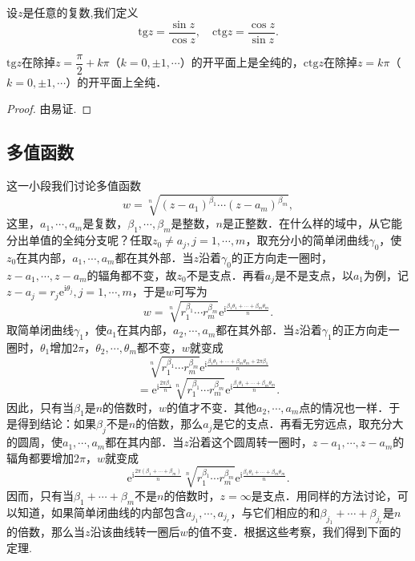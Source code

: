 \documentclass[../../main.tex]{subfiles}
\begin{document}
\begin{definition}
设$z$是任意的复数,我们定义
\[
\text{tg} z = \dfrac{\sin z}{\cos z},
\quad 
\text{ctg} z = \dfrac{\cos z}{\sin z}.
\]
\end{definition}

\begin{proposition}
$\text{tg} z$在除掉$z = \dfrac{\pi}{2} + k\pi$（$k = 0, \pm 1, \cdots$）的开平面上是全纯的，$\text{ctg} z$在除掉$z = k\pi$（$k = 0, \pm 1, \cdots$）的开平面上全纯．
\end{proposition}
\begin{proof}
由易证.
\end{proof}



\subsection{多值函数}

这一小段我们讨论多值函数
\[
w = \sqrt[n]{(z - a_1)^{\beta_1} \cdots (z - a_m)^{\beta_m}},
\]
这里，$a_1, \cdots, a_m$是复数，$\beta_1, \cdots, \beta_m$是整数，$n$是正整数．在什么样的域中，从它能分出单值的全纯分支呢？任取$z_0 \neq a_j, j = 1, \cdots, m$，取充分小的简单闭曲线$\gamma_0$，使$z_0$在其内部，$a_1, \cdots, a_m$都在其外部．当$z$沿着$\gamma_0$的正方向走一圈时，$z - a_1, \cdots, z - a_m$的辐角都不变，故$z_0$不是支点．再看$a_j$是不是支点，以$a_1$为例，记$z - a_j = r_j \text{e}^{\text{i}\theta_j}, j = 1, \cdots, m$，于是$w$可写为
\[
w = \sqrt[n]{r_1^{\beta_1} \cdots r_m^{\beta_m}} \text{e}^{\text{i}\frac{\beta_1 \theta_1 + \cdots + \beta_m \theta_m}{n}}.
\]
取简单闭曲线$\gamma_1$，使$a_1$在其内部，$a_2, \cdots, a_m$都在其外部．当$z$沿着$\gamma_1$的正方向走一圈时，$\theta_1$增加$2\pi$，$\theta_2, \cdots, \theta_m$都不变，$w$就变成
\[
\sqrt[n]{r_1^{\beta_1} \cdots r_m^{\beta_m}} \text{e}^{\text{i}\frac{\beta_1 \theta_1 + \cdots + \beta_m \theta_m + 2\pi \beta_1}{n}}
\]
\[
= \text{e}^{\text{i}\frac{2\pi \beta_1}{n}} \sqrt[n]{r_1^{\beta_1} \cdots r_m^{\beta_m}} \text{e}^{\text{i}\frac{\beta_1 \theta_1 + \cdots + \beta_m \theta_m}{n}}.
\]
因此，只有当$\beta_1$是$n$的倍数时，$w$的值才不变．其他$a_2, \cdots, a_m$点的情况也一样．于是得到结论：如果$\beta_j$不是$n$的倍数，那么$a_j$是它的支点．再看无穷远点，取充分大的圆周，使$a_1, \cdots, a_m$都在其内部．当$z$沿着这个圆周转一圈时，$z - a_1, \cdots, z - a_m$的辐角都要增加$2\pi$，$w$就变成
\[
\text{e}^{\text{i}\frac{2\pi (\beta_1 + \cdots + \beta_m)}{n}} \sqrt[n]{r_1^{\beta_1} \cdots r_m^{\beta_m}} \text{e}^{\text{i}\frac{\beta_1 \theta_1 + \cdots + \beta_m \theta_m}{n}}.
\]
因而，只有当$\beta_1 + \cdots + \beta_m$不是$n$的倍数时，$z = \infty$是支点．用同样的方法讨论，可以知道，如果简单闭曲线的内部包含$a_{j_1}, \cdots, a_{j_r}$，与它们相应的和$\beta_{j_1} + \cdots + \beta_{j_r}$是$n$的倍数，那么当$z$沿该曲线转一圈后$w$的值不变．根据这些考察，我们得到下面的定理.
\end{document}
